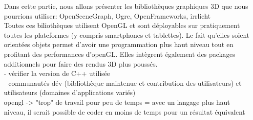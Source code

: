 Dans cette partie, nous allons présenter les bibliothèques graphiques 3D que nous pourrions utiliser: OpenSceneGraph, Ogre, OpenFrameworks, irrlicht \\
Toutes ces biliothèques utilisent OpenGL et sont déployables sur pratiquement toutes les plateformes (y compris smartphones et tablettes). Le fait qu'elles soient orientées objets permet d'avoir une programmation plus haut niveau tout en profitant des performances d'openGL. Elles intègrent également des packages additionnels pour faire des rendus 3D plus poussés. \\

- vérifier la version de C++ utilisée \\
- communautés dév (bibliothèque maintenue et contribution des utilisateurs) et utilisateurs (domaines d'applications variés) \\

opengl -> "trop" de travail pour peu de temps  = avec un langage plus haut niveau, il serait possible de coder en moins de temps pour un résultat équivalent
